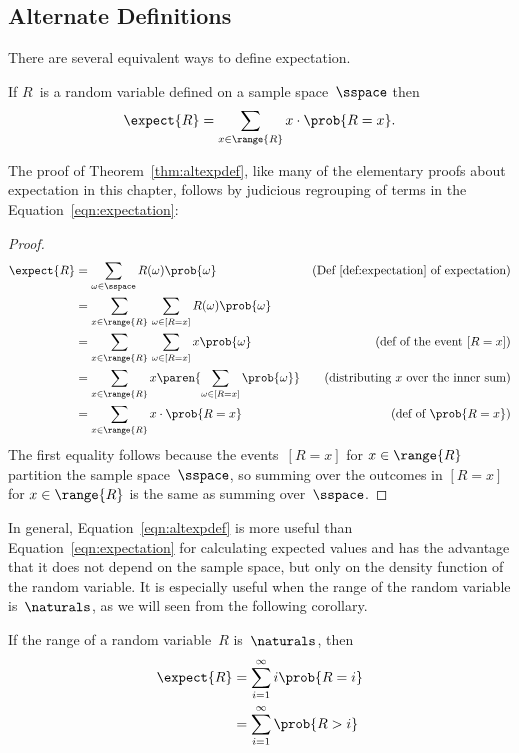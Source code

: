 \subsection{Alternate Definitions}

There are several equivalent ways to define expectation.

\begin{theorem}\label{thm:altexpdef}
If $R$~is a random variable defined on a sample space~$\sspace$ then
\begin{equation}\label{eqn:altexpdef}
    \expect{R} = \sum_{x \in \range{R}} x \cdot \prob{R = x}.
\end{equation}
\end{theorem}
The proof of Theorem~\ref{thm:altexpdef}, like many of the elementary proofs
about expectation in this chapter, follows by judicious regrouping of terms
in the Equation~\ref{eqn:expectation}:
\begin{proof}
\begin{align*}
\expect{R}
    &= \sum_{\omega \in \sspace} R(\omega) \prob{\omega}
            &\text{(Def~\ref{def:expectation} of expectation)} \\
    &= \sum_{x \in \range{R}} \, \sum_{\omega \in [R=x]} R(\omega) \prob{\omega}
                \\
    &= \sum_{x \in \range{R}} \, \sum_{\omega \in [R=x]} x \prob{\omega}
            &\text{(def of the event $[R=x]$)}\\
    &= \sum_{x \in \range{R}} x \paren{\sum_{\omega \in [R=x]} \prob{\omega}}
            & \text{(distributing $x$ over the inner sum)} \\
    &= \sum_{x \in \range{R}} x \cdot \prob{R = x}
            & \text{(def of $\prob{R=x}$)}
\end{align*}
The first equality follows because the events~$[R=x]$ for $x \in
\range{R}$ partition the sample space~$\sspace$, so summing over the
outcomes in $[R=x]$ for $x \in \range{R}$ is the same as summing
over~$\sspace$.
\end{proof}

In general, Equation~\ref{eqn:altexpdef} is more useful than
Equation~\ref{eqn:expectation} for calculating expected values and has
the advantage that it does not depend on the sample space, but only on
the density function of the random variable.  It is especially useful
when the range of the random variable is~$\naturals$, as we will seen
from the following corollary.

\begin{corollary}\label{cor:17A4}
If the range of a random variable~$R$ is~$\naturals$, then
\begin{align*}
\expect{R}
    &= \sum_{i = 1}^\infty i \prob{R = i} \notag\\
    &= \sum_{i = 1}^\infty \prob{R > i} \label{eqn:17A6}
\end{align*}
\end{corollary}

